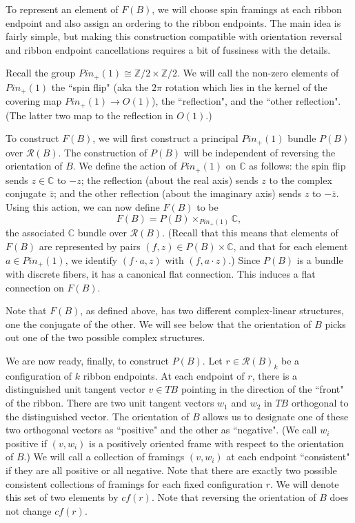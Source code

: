 \documentclass[12pt,a4paper]{article}
\newcommand{\zz}{\mathbb{Z}}
\newcommand{\cc}{\mathbb{C}}
\newcommand{\mcr}{\mathcal{R}}
\newcommand\be            {\begin{equation}}
\newcommand\ee            {\end{equation}}
\newcommand{\kw}[1]{{\color{kwcolor}\footnotesize{(KW) #1}}}
\begin{document}
\medskip

To represent an element of $F(B)$, we will choose spin framings at each ribbon endpoint and also assign
an ordering to the ribbon endpoints.
The main idea is fairly simple, but making this construction compatible with orientation reversal
and ribbon endpoint cancellations requires a bit of fussiness with the details.

\medskip

Recall the group $Pin_+(1) \cong \zz/2 \times \zz/2$.
We will call the non-zero elements of $Pin_+(1)$ the ``spin flip" (aka the $2\pi$ rotation which lies in the kernel of the covering map
$Pin_+(1) \to O(1)$), the ``reflection", and the ``other reflection".
(The latter two map to the reflection in $O(1)$.)

To construct $F(B)$, we will first construct a principal $Pin_+(1)$ bundle $P(B)$ over $\mcr(B)$.
The construction of $P(B)$ will be independent of reversing the orientation of $B$.
We define the action of $Pin_+(1)$ on $\cc$ as follows:
the spin flip sends $z\in \cc$ to $-z$;
the reflection (about the real axis) sends $z$ to the complex conjugate $\bar z$;
and the other reflection (about the imaginary axis) sends $z$ to $-\bar z$.
Using this action, we can now define $F(B)$ to be
\be \label{fermbundef}
	F(B) = P(B) \times_{Pin_+(1)} \cc ,
\ee
the associated $\cc$ bundle over $\mcr(B)$.
(Recall that this means that elements of $F(B)$ are represented by pairs $(f, z) \in P(B) \times \cc$,
and that for each element $a \in Pin_+(1)$, we identify $(f\cdot a, z)$ with $(f, a \cdot z)$.)
Since $P(B)$ is a bundle with discrete fibers, it has a canonical flat connection.
This induces a flat connection on $F(B)$.

Note that $F(B)$, as defined above, has two different complex-linear structures, one the conjugate of the other.
We will see below that the orientation of $B$ picks out one of the two possible complex structures.

\medskip

We are now ready, finally, to construct $P(B)$.
Let $r \in \mcr(B)_k$ be a configuration of $k$ ribbon endpoints.
At each endpoint of $r$, there is a distinguished unit tangent vector $v \in TB$
pointing in the direction of the ``front" of the ribbon.
There are two unit tangent vectors $w_1$ and $w_2$ in $TB$ orthogonal to the distinguished vector.
The orientation of $B$ allows us to designate one of these two orthogonal vectors as ``positive"
and the other as ``negative".
(We call $w_i$ positive if $(v, w_i)$ is a positively oriented frame with respect to the orientation of $B$.)
We will call a collection of framings $(v, w_i)$ at each endpoint ``consistent" if they are all positive
or all negative.
Note that there are exactly two possible consistent collections of framings for each fixed configuration $r$.
We will denote this set of two elements by $cf(r)$.
Note that reversing the orientation of $B$ does not change $cf(r)$.
\end{document}
